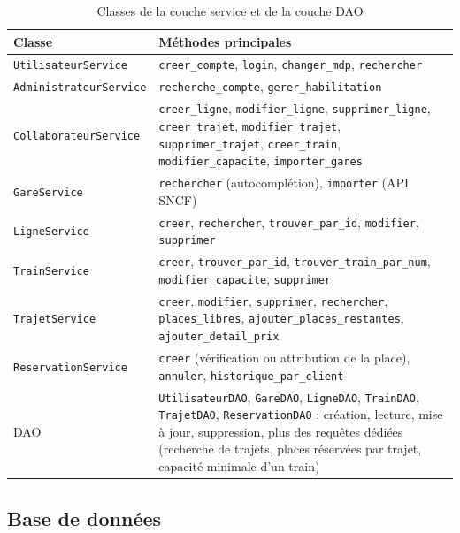 \documentclass[11pt,a4paper]{article}
\newcommand{\code}[1]{\texttt{#1}}
\begin{document}
\begin{table}[H]
\centering\small
\begin{tabularx}{\textwidth}{@{}l Y@{}}
\toprule
\textbf{Classe} & \textbf{Méthodes principales} \\
\midrule
\code{UtilisateurService}    & \code{creer\_compte}, \code{login}, \code{changer\_mdp}, \code{rechercher} \\
\code{AdministrateurService} & \code{recherche\_compte}, \code{gerer\_habilitation} \\
\code{CollaborateurService}  & \code{creer\_ligne}, \code{modifier\_ligne}, \code{supprimer\_ligne},
                               \code{creer\_trajet}, \code{modifier\_trajet}, \code{supprimer\_trajet},
                               \code{creer\_train}, \code{modifier\_capacite}, \code{importer\_gares} \\
\code{GareService}           & \code{rechercher} (autocomplétion), \code{importer} (API SNCF) \\
\code{LigneService}          & \code{creer}, \code{rechercher}, \code{trouver\_par\_id}, \code{modifier}, \code{supprimer} \\
\code{TrainService}          & \code{creer}, \code{trouver\_par\_id}, \code{trouver\_train\_par\_num},
                               \code{modifier\_capacite}, \code{supprimer} \\
\code{TrajetService}         & \code{creer}, \code{modifier}, \code{supprimer}, \code{rechercher},
                               \code{places\_libres}, \code{ajouter\_places\_restantes}, \code{ajouter\_detail\_prix} \\
\code{ReservationService}    & \code{creer} (vérification ou attribution de la place), \code{annuler},
                               \code{historique\_par\_client} \\
\midrule
DAO & \code{UtilisateurDAO}, \code{GareDAO}, \code{LigneDAO}, \code{TrainDAO}, \code{TrajetDAO},
      \code{ReservationDAO} : création, lecture, mise à jour, suppression, plus des requêtes
      dédiées (recherche de trajets, places réservées par trajet, capacité minimale d'un train) \\
\bottomrule
\end{tabularx}
\caption{Classes de la couche service et de la couche DAO}\label{tab:services}
\end{table}

\subsection{Base de données}\label{sec:bdd}
\end{document}
